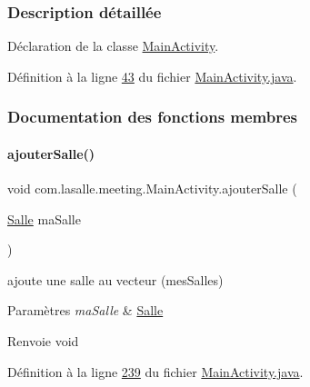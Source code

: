 \subsubsection{Description détaillée}
Déclaration de la classe \hyperlink{classcom_1_1lasalle_1_1meeting_1_1_main_activity}{Main\+Activity}. 

Définition à la ligne \hyperlink{_main_activity_8java_source_l00043}{43} du fichier \hyperlink{_main_activity_8java_source}{Main\+Activity.\+java}.



\subsubsection{Documentation des fonctions membres}
\mbox{\label{classcom_1_1lasalle_1_1meeting_1_1_main_activity_a8fded0b03a19faea1b0e735af1aa52ca}} 
\paragraph{\texorpdfstring{ajouter\+Salle()}{ajouterSalle()}}
{\footnotesize\ttfamily void com.\+lasalle.\+meeting.\+Main\+Activity.\+ajouter\+Salle (\begin{DoxyParamCaption}\item[{\hyperlink{classcom_1_1lasalle_1_1meeting_1_1_salle}{Salle}}]{ma\+Salle }\end{DoxyParamCaption})}



ajoute une salle au vecteur (mes\+Salles) 


\begin{DoxyParams}{Paramètres}
{\em ma\+Salle} & \hyperlink{classcom_1_1lasalle_1_1meeting_1_1_salle}{Salle} \\
\hline
\end{DoxyParams}
\begin{DoxyReturn}{Renvoie}
void 
\end{DoxyReturn}


Définition à la ligne \hyperlink{_main_activity_8java_source_l00239}{239} du fichier \hyperlink{_main_activity_8java_source}{Main\+Activity.\+java}.



